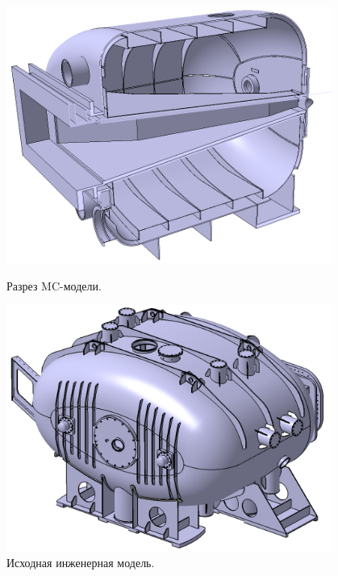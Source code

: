 \begin{figure}[H]
\begin{minipage}[b]{0.495\textwidth}
\includegraphics[width=0.95\textwidth]{pictures/GLAD3.png}
\caption{Разрез MC-модели.}
\label{fig:GLAD3}
\end{minipage}
\hspace{0.01\textwidth}
\begin{minipage}[b]{0.495\textwidth}
\includegraphics[width=0.95\textwidth]{pictures/R3B_GLAD_CAD.png}
\caption{Исходная инженерная модель.}
\label{fig:GLAD4}
\end{minipage}
\end{figure}


